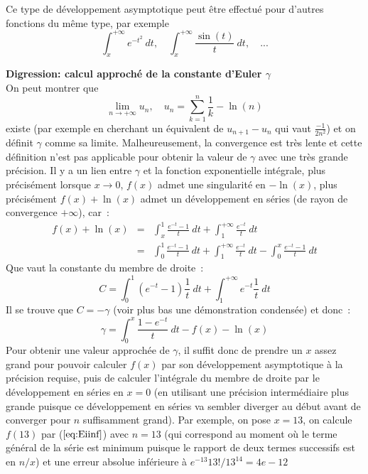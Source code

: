\documentclass[a4paper,11pt]{book}
\begin{document}
\begin{giacjshere}
Ce type de d\'eveloppement asymptotique peut \^etre effectu\'e pour
d'autres fonctions du m\^eme type, par exemple
\[ \int_x^{+\infty} e^{-t^2} \ dt, \quad \int_x^{+\infty} \frac{\sin(t)}{t} \ dt, \quad ... \]


{\bf Digression: calcul approché de la constante d'Euler
  $\gamma$}\\
On peut montrer que
\begin{equation} \label{eq:def_gamma}
 \lim_{n\rightarrow +\infty} u_n, \quad u_n=\sum_{k=1}^{n}\frac{1}{k} - \ln(n) 
\end{equation}
existe (par exemple en cherchant un \'equivalent de $u_{n+1}-u_n$ qui vaut 
$\frac{-1}{2n^2}$)
et on définit $\gamma$ comme sa limite. Malheureusement, la convergence
est très lente et cette définition n'est pas applicable pour obtenir la valeur
de $\gamma$ avec une très grande précision.
Il y a un lien entre $\gamma$ et la fonction exponentielle intégrale, plus précisément
lorsque $x\rightarrow 0$, $f(x)$ admet une singularité en $-\ln(x)$,
plus précisément $f(x)+\ln(x)$
admet un développement en séries (de rayon de convergence $+\infty$), car~:
\begin{eqnarray*}
 f(x)+\ln(x)&=&\int_x^{1}\frac{e^{-t}-1}{t} \ dt + \int_1^{+\infty} \frac{e^{-t}}{t} \ dt \\
&=& \int_0^{1}\frac{e^{-t}-1}{t} \ dt + \int_1^{+\infty} \frac{e^{-t}}{t} \ dt
- \int_0^{x} \frac{e^{-t}-1}{t} \ dt
\end{eqnarray*}
Que vaut la constante du membre de droite~:
\[ C=\int_0^{1}(e^{-t}-1)\frac{1}{t} \ dt + \int_1^{+\infty} e^{-t} \frac{1}{t} \ dt \]
Il se trouve que $C=-\gamma$ (voir plus bas une démonstration condensée) et donc~:
\begin{equation} \label{eq:gamma}
 \gamma= \int_0^{x} \frac{1-e^{-t}}{t} \ dt -f(x)-\ln(x)
\end{equation}
Pour obtenir une valeur approchée de $\gamma$, il suffit donc de prendre un $x$ assez grand
pour pouvoir calculer $f(x)$ par son développement asymptotique à la précision requise,
puis de calculer l'intégrale du membre de droite par le développement en séries en $x=0$
(en utilisant une précision intermédiaire plus grande puisque ce développement en séries
va sembler diverger au début avant de converger pour $n$ suffisamment grand).
Par exemple, on pose $x=13$, on calcule $f(13)$ par (\(\ref{eq:Eiinf}\))
avec $n=13$ (qui correspond au moment o\`u le terme g\'en\'eral
de la s\'erie est minimum puisque le rapport de deux termes successifs
est en $n/x$)
et une erreur absolue inf\'erieure \`a $e^{-13} 13!/13^{14}=4e-12$

\end{giacjshere}
\end{document}
